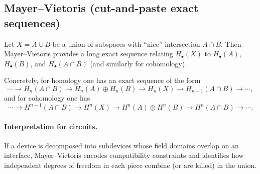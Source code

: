 \documentclass[11pt]{article}
\begin{document}
\subsection{Mayer--Vietoris (cut-and-paste exact sequences)}
\label{sec:mayervietoris}
Let $X=A\cup B$ be a union of subspaces with ``nice'' intersection $A\cap B$.
Then Mayer--Vietoris provides a long exact sequence relating $H_\bullet(X)$ to $H_\bullet(A)$, $H_\bullet(B)$, and $H_\bullet(A\cap B)$ (and similarly for cohomology).

Concretely, for homology one has an exact sequence of the form
\[
\cdots \longrightarrow H_n(A\cap B)\longrightarrow H_n(A)\oplus H_n(B)\longrightarrow H_n(X)\longrightarrow H_{n-1}(A\cap B)\longrightarrow \cdots,
\]
and for cohomology one has
\[
\cdots \longrightarrow H^{n-1}(A\cap B)\longrightarrow H^{n}(X)\longrightarrow H^{n}(A)\oplus H^{n}(B)\longrightarrow H^{n}(A\cap B)\longrightarrow \cdots.
\]

\paragraph{Interpretation for circuits.}
If a device is decomposed into subdevices whose field domains overlap on an interface, Mayer--Vietoris encodes compatibility constraints and identifies how independent degrees of freedom in each piece combine (or are killed) in the union.
\end{document}
